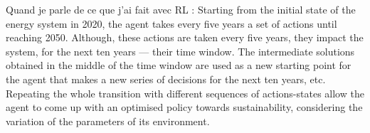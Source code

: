 Quand je parle de ce que j'ai fait avec RL : Starting from the initial state of the energy system in 2020, the agent takes every five years a set of actions until reaching 2050. Although, these actions are taken every five years, they impact the system, for the next ten years --- their time window. The intermediate solutions obtained in the middle of the time window are used as a new starting point for the agent that makes a new series of decisions for the next ten years, etc. Repeating the whole transition with different sequences of actions-states allow the agent to come up with an optimised policy towards sustainability, considering the variation of the parameters of its environment.

